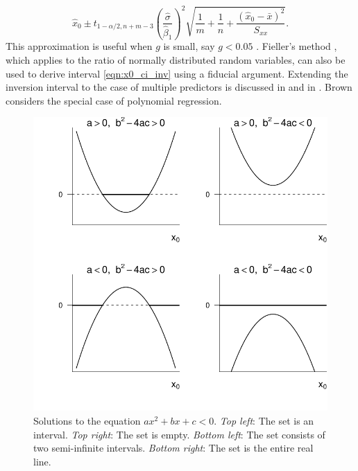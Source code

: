 \documentclass[cmfont,usenames,dvipsnames,leqno]{afit-etd}\usepackage[]{graphicx}\usepackage[]{color}
\makeatletter
\def\maxwidth{ %
  \ifdim\Gin@nat@width>\linewidth
    \linewidth
  \else
    \Gin@nat@width
  \fi
}
\newenvironment{knitrout}{}{} %
\renewenvironment{knitrout}{\begin{singlespace}}{\end{singlespace}}
\newcommand{\wh}[1]{\ensuremath{\widehat{#1}}}
\newcommand{\tquant}[2]{\ensuremath{t_{#1,#2}}}
\makeatother
\begin{document}
\begin{equation}
\label{eqn:x0_ci_inv_approx}
  \wh{x}_0 \pm \tquant{1-\alpha/2}{n+m-3}\left(\frac{\wh{\sigma}}{\wh{\beta}_1}\right)^2\sqrt{\frac{1}{m}+\frac{1}{n}+\frac{(\wh{x}_0-\bar{x})^2}{S_{xx}}}.
\end{equation}
This approximation is useful when $g$ is small, say $g < 0.05$ \citep{draper_applied_1981}. Fieller's method \citep{fieller_some_1954}, which applies to the ratio of normally distributed random variables, can also be used to derive interval \eqref{eqn:x0_ci_inv} using a fiducial argument. Extending the inversion interval to the case of multiple predictors is discussed in \citet[pg. 229]{draper_applied_1981} and in \citet[chap. 3]{brown_measurement_1993}. Brown considers the special case of polynomial regression.

\begin{knitrout}
\color{fgcolor}\begin{figure}[H]

\includegraphics[width=\maxwidth]{figure/quadratics} \caption[Solutions to the equation $ax^2 + bx + c < 0$]{Solutions to the equation $ax^2 + bx + c < 0$. \textit{Top left}: The set is an interval. \textit{Top right}: The set is empty. \textit{Bottom left}: The set consists of two semi-infinite intervals. \textit{Bottom right}: The set is the entire real line.\label{fig:quadratics}}
\end{figure}


\end{knitrout}
\end{document}

